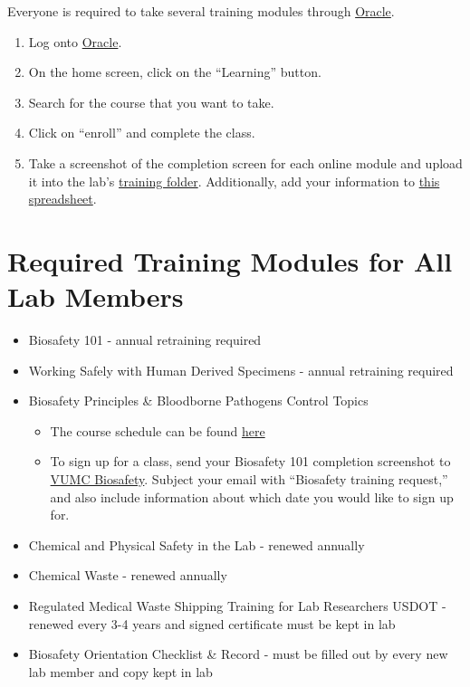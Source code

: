 \documentclass[
]{book}
\providecommand{\tightlist}{%
  \setlength{\itemsep}{0pt}\setlength{\parskip}{0pt}}
\begin{document}
Everyone is required to take several training modules through \href{https://sso-login.vanderbilt.edu/idp/startSSO.ping?PartnerSpId=https://ecsr.login.us2.oraclecloud.com/fed}{Oracle}.

\begin{enumerate}
\def\labelenumi{\arabic{enumi}.}
\tightlist
\item
  Log onto \href{https://sso-login.vanderbilt.edu/idp/startSSO.ping?PartnerSpId=https://ecsr.login.us2.oraclecloud.com/fed}{Oracle}.
\item
  On the home screen, click on the ``Learning'' button.
\item
  Search for the course that you want to take.
\item
  Click on ``enroll'' and complete the class.
\item
  Take a screenshot of the completion screen for each online module and upload it into the lab's \href{https://drive.google.com/drive/folders/1Pbd_SUiZBgL05-BIzgbOpVR8v9ruP0hX?usp=sharing}{training folder}. Additionally, add your information to \href{https://docs.google.com/spreadsheets/d/10eLenI7HV4UPG1CfjAYf9VOY3tXPomWy_ds34bMWDcc/edit?usp=sharing}{this spreadsheet}.
\end{enumerate}

\hypertarget{required-training-modules-for-all-lab-members}{%
\section{Required Training Modules for All Lab Members}\label{required-training-modules-for-all-lab-members}}

\begin{itemize}
\item
  Biosafety 101 - annual retraining required
\item
  Working Safely with Human Derived Specimens - annual retraining required
\item
  Biosafety Principles \& Bloodborne Pathogens Control Topics

  \begin{itemize}
  \tightlist
  \item
    The course schedule can be found \href{https://www.vumc.org/safety/training/biosafety-principles-schedule}{here}
  \item
    To sign up for a class, send your Biosafety 101 completion screenshot to \href{mailto:biosafety@vumc.org}{VUMC Biosafety}. Subject your email with ``Biosafety training request,'' and also include information about which date you would like to sign up for.
  \end{itemize}
\item
  Chemical and Physical Safety in the Lab - renewed annually
\item
  Chemical Waste - renewed annually
\item
  Regulated Medical Waste Shipping Training for Lab Researchers USDOT - renewed every 3-4 years and signed certificate must be kept in lab
\item
  Biosafety Orientation Checklist \& Record - must be filled out by every new lab member and copy kept in lab
\end{itemize}
\end{document}
